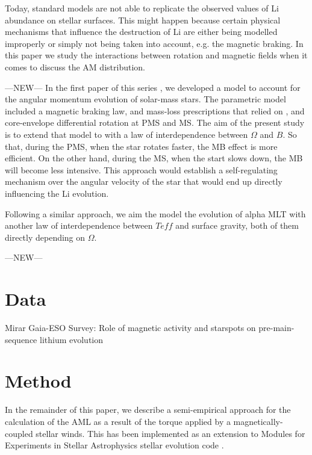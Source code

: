 \documentclass[fleqn,usenatbib]{mnras}
\begin{document}
Today, standard models are not able to replicate the observed values of Li abundance on stellar surfaces. This might happen because certain physical mechanisms that influence the destruction of Li are either being modelled improperly or simply not being taken into account, e.g. the magnetic braking. In this paper we study the interactions between rotation and magnetic fields when it comes to discuss the AM distribution. \par
---NEW---
In the first paper of this series \citep{Navarro2020}, we developed a model to account for the angular momentum evolution of solar-mass stars. The parametric model included a magnetic braking law, and mass-loss prescriptions that relied on \citet{Ud-Doula2008}, and core-envelope differential rotation at PMS and MS. The aim of the present study is to extend that model to with a law of interdependence between $\Omega$ and $B$. So that, during the PMS, when the star rotates faster, the MB effect is more efficient. On the other hand, during the MS, when the start slows down, the MB will become less intensive. This approach would establish a self-regulating mechanism over the angular velocity of the star that
would end up directly influencing the Li evolution.\par

Following a similar approach, we aim the model the evolution of alpha MLT with another law of interdependence between $Teff$ and surface gravity, both of them directly depending on $\Omega$.\par

---NEW---

\section{Data} \label{sec_method}
Mirar Gaia-ESO Survey: Role of magnetic activity and starspots on pre-main-sequence lithium evolution

\section{Method} \label{sec_method}

In the remainder of this paper, we describe a semi-empirical approach for the calculation of the AML as a result of the torque applied by a magnetically-coupled stellar winds. This has been implemented as an extension to Modules for Experiments in Stellar Astrophysics stellar evolution code \citep[MESA; ][]{Paxton2011, Paxton2013,Paxton2015, Paxton2018, Paxton2019}.
\end{document}
